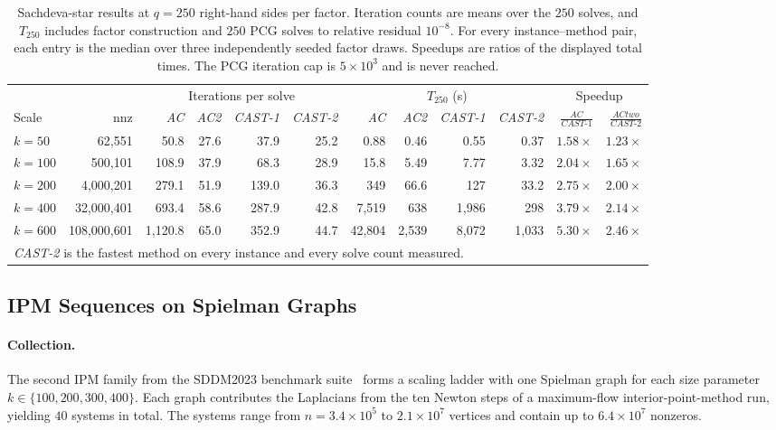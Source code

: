 \documentclass{article}
\newcommand{\CASTone}{\textit{CAST-1}\xspace}
\newcommand{\CASTtwo}{\textit{CAST-2}\xspace}
\newcommand{\AC}{\textit{AC}\xspace}
\newcommand{\ACtwo}{\textit{AC2}\xspace}
\newcommand{\1}{\mathbbm{1}}
\theoremstyle{plain}
\begin{document}
\begin{table}[!ht]
\centering
\caption{Sachdeva-star results at $q=250$ right-hand sides per factor.
Iteration counts are means over the $250$ solves, and $T_{250}$
includes factor construction and $250$ PCG solves to relative residual
$10^{-8}$. For every instance--method pair, each entry is the median
over three independently seeded factor draws. Speedups are ratios of
the displayed total times. The PCG iteration cap is $5\times10^{3}$
and is never reached.}
\label{tab:sachdeva}
\footnotesize
\begin{tabular}{l r rrrr rrrr rr}
\toprule
& & \multicolumn{4}{c}{Iterations per solve} &
\multicolumn{4}{c}{$T_{250}$ (s)} &
\multicolumn{2}{c}{Speedup} \\
\cmidrule(lr){3-6}\cmidrule(lr){7-10}\cmidrule(lr){11-12}
Scale & nnz &
\AC & \ACtwo & \CASTone & \CASTtwo &
\AC & \ACtwo & \CASTone & \CASTtwo &
$\frac{AC}{\CASTone}$ &
$\frac{ACtwo}{\CASTtwo}$ \\
\midrule
$k=50$ & 62{,}551 & 50.8 & 27.6 & 37.9 & 25.2 &
0.88 & 0.46 & 0.55 & 0.37 & $1.58\times$ & $1.23\times$ \\
$k=100$ & 500{,}101 & 108.9 & 37.9 & 68.3 & 28.9 &
15.8 & 5.49 & 7.77 & 3.32 & $2.04\times$ & $1.65\times$ \\
$k=200$ & 4{,}000{,}201 & 279.1 & 51.9 & 139.0 & 36.3 &
349 & 66.6 & 127 & 33.2 & $2.75\times$ & $2.00\times$ \\
$k=400$ & 32{,}000{,}401 & 693.4 & 58.6 & 287.9 & 42.8 &
7{,}519 & 638 & 1{,}986 & 298 & $3.79\times$ & $2.14\times$ \\
$k=600$ & 108{,}000{,}601 & 1{,}120.8 & 65.0 & 352.9 & 44.7 &
42{,}804 & 2{,}539 & 8{,}072 & 1{,}033 &
$5.30\times$ & $2.46\times$ \\
\midrule
\multicolumn{12}{l}{\CASTtwo is the fastest method on every instance and every solve count measured.} \\
\bottomrule
\end{tabular}
\end{table}


\subsection{IPM Sequences on Spielman Graphs}
\label{sec:spielman}

\paragraph{Collection.}
The second IPM family from the SDDM2023 benchmark
suite~\cite{AC} forms a scaling ladder with one Spielman graph for each size
parameter $k\in\{100,200,300,400\}$. Each graph contributes the
Laplacians from the ten Newton steps of a maximum-flow
interior-point-method run, yielding $40$ systems in total. The systems range from
$n=3.4\times10^{5}$ to $2.1\times10^{7}$ vertices and contain up to
$6.4\times10^{7}$ nonzeros.
\end{document}
